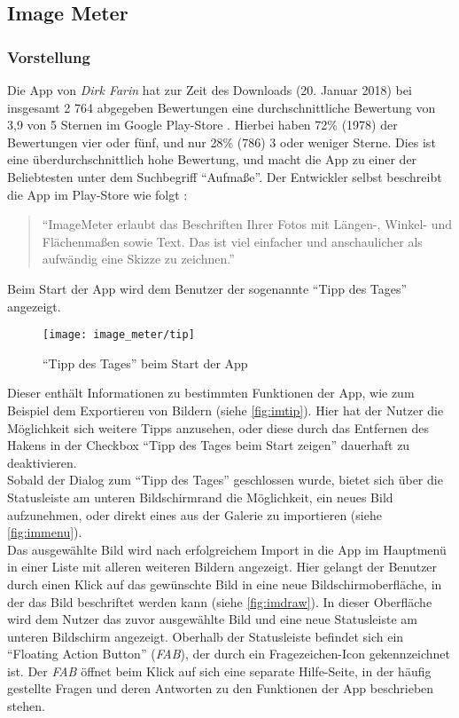 \subsection{Image Meter}

\subsubsection{Vorstellung}
Die App \im{} von \emph{Dirk Farin} hat zur Zeit des Downloads (20. Januar 2018) bei insgesamt 2 764 abgegeben Bewertungen eine durchschnittliche Bewertung von 3,9 von 5 Sternen im Google Play-Store \citep{FarinIM}.
Hierbei haben 72\% (1978) der Bewertungen vier oder fünf, und nur 28\% (786) 3 oder weniger Sterne.
Dies ist eine überdurchschnittlich hohe Bewertung, und macht die App zu einer der Beliebtesten unter dem Suchbegriff ``Aufmaße''.
Der Entwickler selbst beschreibt die App im Play-Store wie folgt \citep{FarinIM}:

\begin{quote}
  ``ImageMeter erlaubt das Beschriften Ihrer Fotos mit Längen-, Winkel- und Flächenmaßen sowie Text.
  Das ist viel einfacher und anschaulicher als aufwändig eine Skizze zu zeichnen.''
\end{quote}

\noindent
Beim Start der App wird dem Benutzer der sogenannte ``Tipp des Tages'' angezeigt.

\begin{wrapfigure}{R}{0.5\textwidth}
  \centering
  \texttt{[image: image\_meter/tip]}
  \caption{``Tipp des Tages'' beim Start der App}
  \label{fig:imtip}
\end{wrapfigure}

Dieser enthält Informationen zu bestimmten Funktionen der App, wie zum Beispiel dem Exportieren von Bildern (siehe \autoref{fig:imtip}).
Hier hat der Nutzer die Möglichkeit sich weitere Tipps anzusehen, oder diese durch das Entfernen des Hakens in der Checkbox ``Tipp des Tages beim Start zeigen'' dauerhaft zu deaktivieren. \\

Sobald der Dialog zum ``Tipp des Tages'' geschlossen wurde, bietet sich über die Statusleiste am unteren Bildschirmrand die Möglichkeit, ein neues Bild aufzunehmen, oder direkt eines aus der Galerie zu importieren (siehe \autoref{fig:immenu}). \\

Das ausgewählte Bild wird nach erfolgreichem Import in die App im Hauptmenü in einer Liste mit alleren weiteren Bildern angezeigt.
Hier gelangt der Benutzer durch einen Klick auf das gewünschte Bild in eine neue Bildschirmoberfläche, in der das Bild beschriftet werden kann (siehe \autoref{fig:imdraw}).
In dieser Oberfläche wird dem Nutzer das zuvor ausgewählte Bild und eine neue Statusleiste am unteren Bildschirm angezeigt.
Oberhalb der Statusleiste befindet sich ein ``Floating Action Button'' (\emph{FAB}), der durch ein Fragezeichen-Icon gekennzeichnet ist.
Der \emph{FAB} öffnet beim Klick auf sich eine separate Hilfe-Seite, in der häufig gestellte Fragen und deren Antworten zu den Funktionen der App beschrieben stehen. \\

